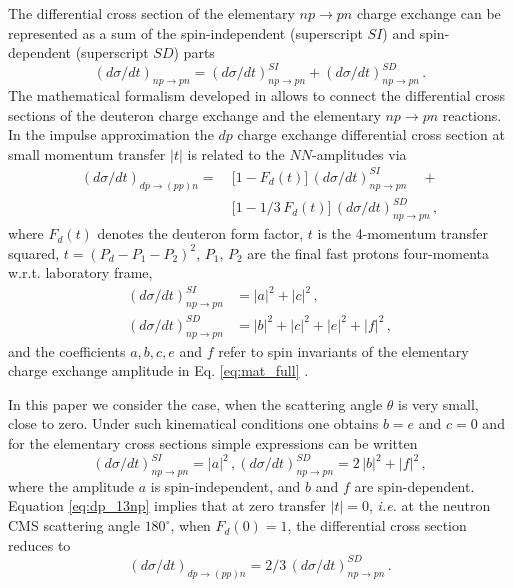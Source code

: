 \documentclass[twocolumn,epjc3]{svjour3}
\newcommand{\np}     {\ensuremath{np \rightarrow pn}\xspace}
\newcommand{\dpchex} {\ensuremath{dp \rightarrow (pp)n}\xspace}
\begin{document}
The differential cross section of the elementary \np charge exchange can be
represented as a sum of the spin-independent (superscript $SI$) and
spin-dependent (superscript $SD$) parts
\begin{equation}
  \label{eq:np_sum}
  (d\sigma/dt)_{\np} = (d\sigma/dt)^{SI}_{\np} + (d\sigma/dt)^{SD}_{\np}\,.
\end{equation}
The mathematical formalism developed in \cite{dea72, dea72_2, bug87} allows to
connect the differential cross sections of the deuteron charge exchange and the
elementary \np reactions. In the impulse approximation the $dp$ charge exchange
differential cross section at small momentum transfer $|t|$ is related to the
$NN$-amplitudes via
\begin{equation}
  \label{eq:dp_13np}
  \begin{split}
    (d\sigma/dt)_{\dpchex} =\ &\bigl[1 - F_d(t)\bigr]\,(d\sigma/dt)^{SI}_{\np}
    \quad + \\
    &\bigl[1 - 1/3\,F_d(t)\bigr]\,(d\sigma/dt)^{SD}_{\np}\,,
  \end{split}
\end{equation}
where $F_d(t)$ denotes the deuteron form factor, $t$ is the 4-mo\-mentum
transfer squared, $t = (P_d - P_1 - P_2)^2$, $P_1$, $P_2$ are the final fast
protons four-momenta w.r.t. laboratory frame,
\begin{equation}
  \begin{split}
    (d\sigma/dt)^{SI}_{\np} &= |a|^2 +|c|^2\,,\\
    (d\sigma/dt)^{SD}_{\np} &= |b|^2 + |c|^2 + |e|^2 + |f|^2\,,
  \end{split}
\end{equation}
and the coefficients $a, b, c, e$ and $f$ refer to spin invariants of the
elementary charge exchange amplitude in Eq. \eqref{eq:mat_full}
\cite{dea72,ala75_2}.

In this paper we consider the case, when the scattering angle $\theta$ is very
small, close to zero. Under such kinematical conditions one obtains $b = e$ and
$c = 0$ and for the elementary cross sections simple expressions can be written
\begin{equation}
  (d\sigma/dt)^{SI}_{\np} = |a|^2\,,
  (d\sigma/dt)^{SD}_{\np} = 2\,|b|^2 + |f|^2\,,
\end{equation}
where the amplitude $a$ is spin-independent, and $b$ and $f$ are spin-dependent.
Equation \eqref{eq:dp_13np} implies that at zero transfer $|t| = 0$,
\textit{i.e.} at the neutron CMS scattering angle $180^\circ$, when
$F_d(0) = 1$, the differential cross section reduces to
\begin{equation}
  \label{eq:dp_23np}
  (d\sigma/dt)_{\dpchex} = 2/3\,(d\sigma/dt)^{SD}_{\np}\,.
\end{equation}
\end{document}
